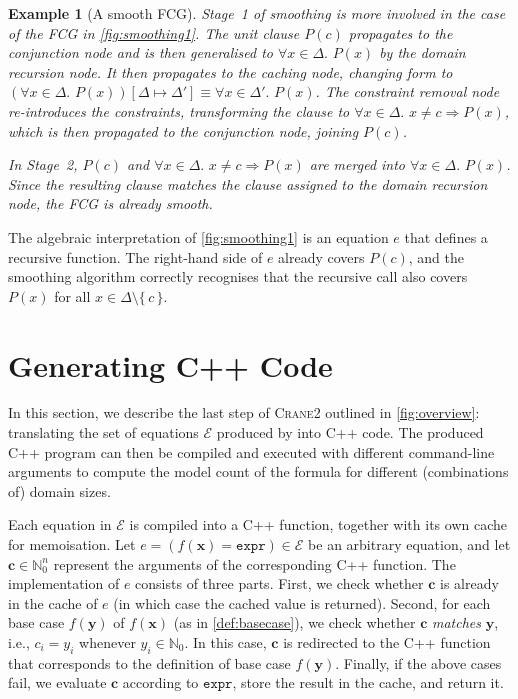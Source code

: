 \documentclass{article}
\newtheorem{example}{Example}
\theoremstyle{remark}
\newcommand{\expr}{\mathtt{expr}}
\newcommand{\Cranetwo}{\textsc{Crane2}}
\begin{document}
\begin{example}[A smooth FCG]\label{example:smooth}
  Stage~1 of smoothing is more involved in the case of the FCG in
  \cref{fig:smoothing1}. The unit clause $P(c)$ propagates to the conjunction
  node and is then generalised to $\forall x \in \Delta\text{. }P(x)$ by the
  domain recursion node. It then propagates to the caching node, changing form
  to $(\forall x \in \Delta\text{.
  }P(x))[\Delta \mapsto \Delta'] \equiv \forall x \in \Delta'\text{. }P(x)$. The
  constraint removal node re-introduces the constraints, transforming the clause
  to $\forall x \in \Delta\text{. }x \ne c \Rightarrow P(x)$, which is then
  propagated to the conjunction node, joining $P(c)$.

  In Stage~2, $P(c)$ and $\forall x \in \Delta\text{. }x \ne c \Rightarrow P(x)$
  are merged into $\forall x \in \Delta\text{. }P(x)$. Since the resulting
  clause matches the clause assigned to the domain recursion node, the FCG is
  already smooth.
\end{example}

The algebraic interpretation of \cref{fig:smoothing1} is an equation $e$ that
defines a recursive function. The right-hand side of $e$ already covers $P(c)$,
and the smoothing algorithm correctly recognises that the recursive call also
covers $P(x)$ for all $x \in \Delta \setminus \{\, c \,\}$.

\section{Generating C++ Code}\label{sec:cpp}

In this section, we describe the last step of \Cranetwo{} outlined in
\cref{fig:overview}: translating the set of equations $\mathcal{E}$ produced by
\CompileWithBaseCases into C++ code. The produced C++ program can then be
compiled and executed with different command-line arguments to compute the model
count of the formula for different (combinations of) domain sizes.

Each equation in $\mathcal{E}$ is compiled into a C++ function, together with
its own cache for memoisation. Let
$e = (f(\mathbf{x}) = \expr{}) \in \mathcal{E}$ be an arbitrary equation, and
let $\mathbf{c} \in \mathbb{N}_{0}^{n}$ represent the arguments of the
corresponding C++ function. The implementation of $e$ consists of three parts.
First, we check whether $\mathbf{c}$ is already in the cache of $e$ (in which
case the cached value is returned). Second, for each base case $f(\mathbf{y})$
of $f(\mathbf{x})$ (as in \cref{def:basecase}), we check whether $\mathbf{c}$
\emph{matches} $\mathbf{y}$, i.e., $c_{i} = y_{i}$ whenever
$y_{i} \in \mathbb{N}_{0}$. In this case, $\mathbf{c}$ is redirected to the C++
function that corresponds to the definition of base case $f(\mathbf{y})$.
Finally, if the above cases fail, we evaluate $\mathbf{c}$ according to
$\expr{}$, store the result in the cache, and return it.
\end{document}
